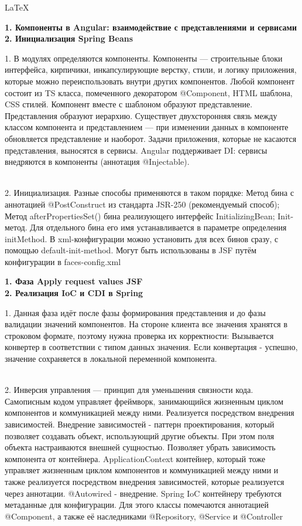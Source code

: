\documentclass{article}
\newcommand{\bil}[4]{%
    \begin{minipage}{.3\textwidth}
        \textbf{1. #1} \\
        \textbf{2. #2}

        1. #3
        \\
        2. #4
    \end{minipage}
}
\begin{document}
\begin{center}
    \LaTeX
\end{center}
\tiny
\bil{Компоненты в Angular: взаимодействие с представлениями и сервисами}{Инициализация Spring Beans}{
    В модулях определяются компоненты. Компоненты — строительные блоки интерфейса, кирпичики, инкапсулирующие верстку, стили, и логику приложения, которые можно переиспользовать внутри других компонентов. 
    Любой компонент состоит из TS класса, помеченного декоратором @Component, HTML шаблона, CSS стилей. 
    Компонент вместе с шаблоном образуют представление. Представления образуют иерархию. 
    Существует двухсторонняя связь между классом компонента и представлением — при изменении данных в компоненте обновляется представление и наоборот.
    Задачи приложения, которые не касаются представления, выносятся в сервисы.
    Angular поддерживает DI: сервисы внедряются в компоненты (аннотация @Injectable).
}{
    Инициализация. Разные способы применяются в таком порядке: Метод бина с аннотацией @PostConstruct из стандарта JSR-250 (рекомендуемый способ); Метод afterPropertiesSet() бина реализующего интерфейс InitializingBean;
    Init-метод. Для отдельного бина его имя устанавливается в параметре определения initMethod. В xml-конфигурации можно установить для всех бинов сразу, с помощью default-init-method.
    Могут быть использованы в JSF путём конфигурации в faces-config.xml
}
\hfill
\bil{Фаза Apply request values JSF}{Реализация IoC и CDI в Spring}{
    Данная фаза идёт после фазы формирования представления и до фазы валидации значений компонентов.
    На стороне клиента все значения хранятся в строковом формате, поэтому нужна проверка их корректности: 
    Вызывается конвертер в соответствии с типом данных значения.
    Если конвертация - успешно, значение сохраняется в локальной переменной компонента.
}{
    Инверсия управления — принцип для уменьшения связности кода. Самописным кодом управляет фреймворк, занимающийся жизненным циклом компонентов и коммуникацией между ними. Реализуется посредством внедрения зависимостей.
    Внедрение зависимостей - паттерн проектирования, который позволяет создавать объект, использующий другие объекты. При этом поля объекта настраиваются внешней сущностью. 
    Позволяет убрать зависимость компонента от контейнера.
    ApplicationContext контейнер, который тоже управляет жизненным циклом компонентов и коммуникацией между ними и также реализуется посредством внедрения зависимостей, которые реализуется через аннотации.
    @Autowired - внедрение. Spring IoC контейнеру требуются метаданные для конфигурации. Для этого классы помечаются аннотацией @Component, а также её наследниками @Repository, @Service и @Controller
}
\end{document}
